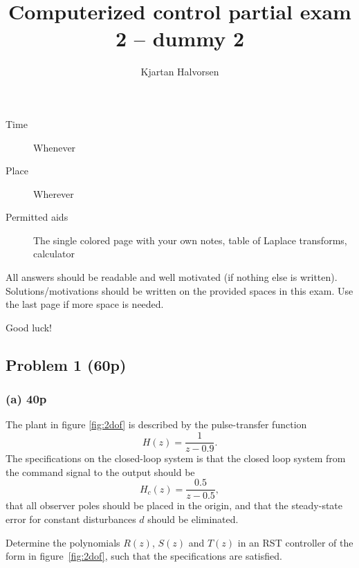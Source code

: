 \documentclass[letter,12pt]{article}
\title{Computerized control partial exam 2  -- dummy 2}
\author{Kjartan Halvorsen}
\newcommand{\bmpl}{\begin{minipage}[t]{\textwidth}}
\newcommand{\emp}{\end{minipage}}
\begin{document}
\maketitle


\begin{description}
\item[Time] Whenever
\item[Place] Wherever
\item[Permitted aids] The single colored page with your own notes, table of Laplace transforms, calculator
\end{description}

All answers should be readable and well motivated (if nothing else is written). Solutions/motivations should be written on the provided spaces in this exam. Use the last page if more space is needed.

\begin{center}
{\Large Good luck!} \\
\end{center}

\noindent
\fbox{
\bmpl
{\bf Matricual and name:}\\
\vspace*{30mm}
\emp}

\clearpage



\subsection*{Problem 1 (60p)}

\subsubsection*{(a) 40p}
The plant in figure \ref{fig:2dof} is described by the pulse-transfer function
\begin{equation}
H(z) = \frac{1}{z-0.9}.
\end{equation}
The specifications on the closed-loop system is that the closed loop system from the command signal to the output should be 
\begin{equation}
H_c(z) = \frac{0.5}{z-0.5},
\end{equation}
that all observer poles should be placed in the origin, and that the steady-state error for constant disturbances $d$ should be eliminated. 

Determine the polynomials \(R(z)\), \(S(z)\) and \(T(z)\) in an RST controller of the form in figure~\ref{fig:2dof}, such that the specifications are satisfied.
\end{document}
